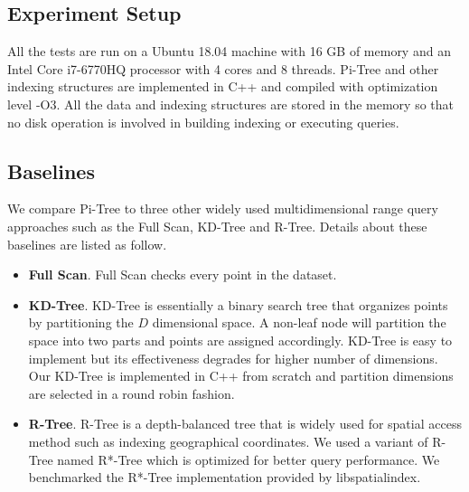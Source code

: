 \documentclass[sigconf,10pt]{acmart}
\begin{document}
\subsection{Experiment Setup}

All the tests are run on a Ubuntu 18.04 machine with 16 GB of memory and an Intel 
Core i7-6770HQ processor with 4 cores and 8 threads. Pi-Tree and other indexing 
structures are implemented in C++ and compiled with optimization level -O3. 
All the data and indexing structures are stored in the memory so that no disk 
operation is involved in building indexing or executing queries.

\subsection{Baselines}

We compare Pi-Tree to three other widely used multidimensional range query approaches 
such as the Full Scan, KD-Tree and R-Tree. Details about these baselines are listed 
as follow. 
\begin{itemize}
    \item \textbf{Full Scan}. Full Scan checks every point in the dataset.
    \item \textbf{KD-Tree}. KD-Tree is essentially a binary search tree that organizes
    points by partitioning the $D$ dimensional space. A non-leaf node will partition 
    the space into two parts and points are assigned accordingly. KD-Tree is easy to 
    implement but its effectiveness degrades for higher number of dimensions. Our KD-Tree is
    implemented in C++ from scratch and partition dimensions are selected in a round robin fashion.
    \item \textbf{R-Tree}. R-Tree is a depth-balanced tree that is widely used for spatial
    access method such as indexing geographical coordinates. We used a variant of R-Tree named
    R*-Tree which is optimized for better query performance. We benchmarked the R*-Tree implementation
    provided by libspatialindex.\cite{libSpatialIndex}
\end{itemize}
\end{document}
